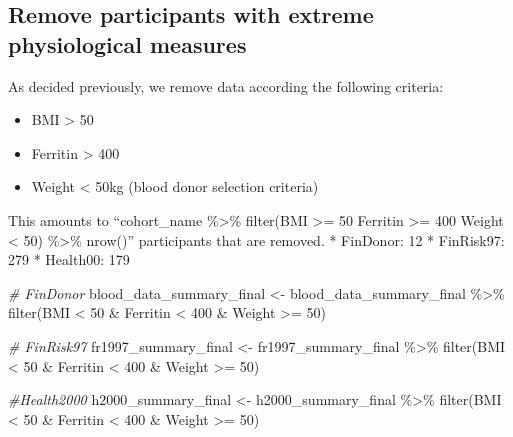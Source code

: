 \documentclass[
]{article}
\newenvironment{Shaded}{\begin{snugshade}}{\end{snugshade}}
\newcommand{\CommentTok}[1]{\textcolor[rgb]{0.56,0.35,0.01}{\textit{#1}}}
\newcommand{\DecValTok}[1]{\textcolor[rgb]{0.00,0.00,0.81}{#1}}
\newcommand{\FunctionTok}[1]{\textcolor[rgb]{0.00,0.00,0.00}{#1}}
\newcommand{\NormalTok}[1]{#1}
\newcommand{\OtherTok}[1]{\textcolor[rgb]{0.56,0.35,0.01}{#1}}
\newcommand{\SpecialCharTok}[1]{\textcolor[rgb]{0.00,0.00,0.00}{#1}}
\providecommand{\tightlist}{%
  \setlength{\itemsep}{0pt}\setlength{\parskip}{0pt}}
\begin{document}
\hypertarget{remove-participants-with-extreme-physiological-measures}{%
\subsection{Remove participants with extreme physiological
measures}\label{remove-participants-with-extreme-physiological-measures}}

As decided previously, we remove data according the following criteria:

\begin{itemize}
\tightlist
\item
  BMI \textgreater{} 50
\item
  Ferritin \textgreater{} 400
\item
  Weight \textless{} 50kg (blood donor selection criteria)
\end{itemize}

This amounts to ``cohort\_name \%\textgreater\% filter(BMI \textgreater=
50 \textbar{} Ferritin \textgreater= 400 \textbar{} Weight \textless{}
50) \%\textgreater\% nrow()'' participants that are removed. * FinDonor:
12 * FinRisk97: 279 * Health00: 179

\begin{Shaded}
\begin{Highlighting}[]
\CommentTok{\# FinDonor}
\NormalTok{blood\_data\_summary\_final }\OtherTok{\textless{}{-}}\NormalTok{ blood\_data\_summary\_final }\SpecialCharTok{\%\textgreater{}\%} 
   \FunctionTok{filter}\NormalTok{(BMI }\SpecialCharTok{\textless{}} \DecValTok{50} \SpecialCharTok{\&}\NormalTok{ Ferritin }\SpecialCharTok{\textless{}} \DecValTok{400} \SpecialCharTok{\&}\NormalTok{ Weight }\SpecialCharTok{\textgreater{}=} \DecValTok{50}\NormalTok{)}

\CommentTok{\# FinRisk97}
\NormalTok{fr1997\_summary\_final }\OtherTok{\textless{}{-}}\NormalTok{ fr1997\_summary\_final }\SpecialCharTok{\%\textgreater{}\%} 
   \FunctionTok{filter}\NormalTok{(BMI }\SpecialCharTok{\textless{}} \DecValTok{50} \SpecialCharTok{\&}\NormalTok{ Ferritin }\SpecialCharTok{\textless{}} \DecValTok{400} \SpecialCharTok{\&}\NormalTok{ Weight }\SpecialCharTok{\textgreater{}=} \DecValTok{50}\NormalTok{)}

\CommentTok{\#Health2000}
\NormalTok{h2000\_summary\_final }\OtherTok{\textless{}{-}}\NormalTok{ h2000\_summary\_final }\SpecialCharTok{\%\textgreater{}\%} 
   \FunctionTok{filter}\NormalTok{(BMI }\SpecialCharTok{\textless{}} \DecValTok{50} \SpecialCharTok{\&}\NormalTok{ Ferritin }\SpecialCharTok{\textless{}} \DecValTok{400} \SpecialCharTok{\&}\NormalTok{ Weight }\SpecialCharTok{\textgreater{}=} \DecValTok{50}\NormalTok{)}
\end{Highlighting}
\end{Shaded}
\end{document}
